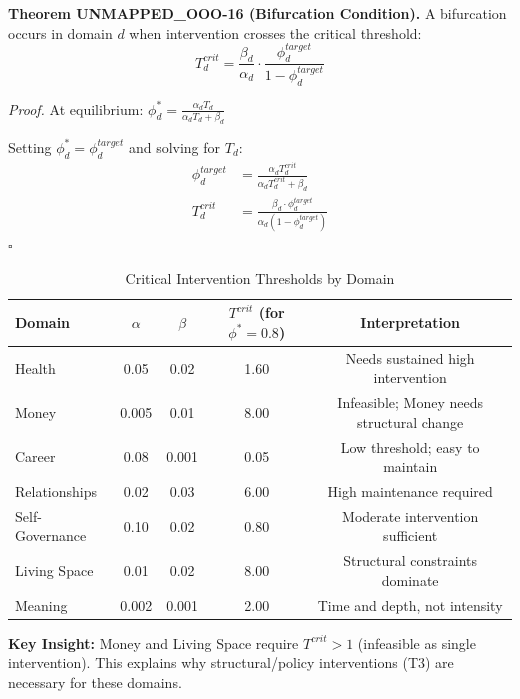 \begin{tcolorbox}[colback=yellow!5!white, colframe=yellow!75!black, title=Theorem UNMAPPED_OOO-16: Universal Bifurcation Condition]
\textbf{Theorem UNMAPPED_OOO-16 (Bifurcation Condition).}
A bifurcation occurs in domain $d$ when intervention crosses the critical threshold:
\begin{equation}
T_d^{crit} = \frac{\beta_d}{\alpha_d} \cdot \frac{\phi_d^{target}}{1 - \phi_d^{target}}
\end{equation}

\textit{Proof.}
At equilibrium: $\phi_d^* = \frac{\alpha_d T_d}{\alpha_d T_d + \beta_d}$

Setting $\phi_d^* = \phi_d^{target}$ and solving for $T_d$:
\begin{align}
\phi_d^{target} &= \frac{\alpha_d T_d^{crit}}{\alpha_d T_d^{crit} + \beta_d} \\
T_d^{crit} &= \frac{\beta_d \cdot \phi_d^{target}}{\alpha_d (1 - \phi_d^{target})}
\end{align}
\hfill $\square$
\end{tcolorbox}

\begin{table}[htbp]
\centering
\caption{Critical Intervention Thresholds by Domain}
\label{tab:ooo-critical}
\renewcommand{\arraystretch}{1.2}
\small
\begin{tabular}{@{}lcccc@{}}
\toprule
\textbf{Domain} & $\alpha$ & $\beta$ & $T^{crit}$ (for $\phi^* = 0.8$) & \textbf{Interpretation} \\
\midrule
Health & 0.05 & 0.02 & 1.60 & Needs sustained high intervention \\
Money & 0.005 & 0.01 & 8.00 & Infeasible; Money needs structural change \\
Career & 0.08 & 0.001 & 0.05 & Low threshold; easy to maintain \\
Relationships & 0.02 & 0.03 & 6.00 & High maintenance required \\
Self-Governance & 0.10 & 0.02 & 0.80 & Moderate intervention sufficient \\
Living Space & 0.01 & 0.02 & 8.00 & Structural constraints dominate \\
Meaning & 0.002 & 0.001 & 2.00 & Time and depth, not intensity \\
\bottomrule
\end{tabular}
\end{table}

\textbf{Key Insight:} Money and Living Space require $T^{crit} > 1$ (infeasible as single intervention).
This explains why structural/policy interventions (T3) are necessary for these domains.

